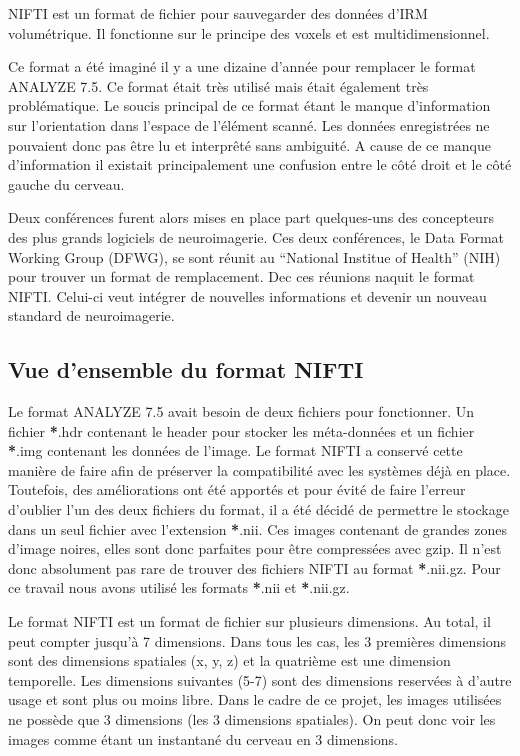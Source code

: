 \documentclass[a4paper,10pt,openany,oneside]{sphinxmanual}
\begin{document}
NIFTI est un format de fichier pour sauvegarder des données d'IRM volumétrique. Il fonctionne
sur le principe des voxels et est multidimensionnel.

Ce format a été imaginé il y a une dizaine d'année pour remplacer le format ANALYZE 7.5.
Ce format était très utilisé mais était également très problématique. Le soucis principal de
ce format étant le manque d'information sur l'orientation dans l'espace de l'élément scanné.
Les données enregistrées ne pouvaient donc pas être lu et interprêté sans ambiguité. A cause
de ce manque d'information il existait principalement une confusion entre le côté droit et le
côté gauche du cerveau.

Deux conférences furent alors mises en place part quelques-uns des concepteurs des plus grands
logiciels de neuroimagerie. Ces deux conférences, le Data Format Working Group (DFWG), se sont
réunit au ``National Institue of Health'' (NIH) pour trouver un format de remplacement. Dec ces
réunions naquit le format NIFTI. Celui-ci veut intégrer de nouvelles informations et devenir
un nouveau standard de neuroimagerie.


\subsection{Vue d'ensemble du format NIFTI}
\label{index:vue-d-ensemble-du-format-nifti}
Le format ANALYZE 7.5 avait besoin de deux fichiers pour fonctionner. Un fichier {\color{red}\bfseries{}*}.hdr contenant
le header pour stocker les méta-données et un fichier {\color{red}\bfseries{}*}.img contenant les données de l'image.
Le format NIFTI a conservé cette manière de faire afin de préserver la compatibilité avec les
systèmes déjà en place. Toutefois, des améliorations ont été apportés et pour évité de faire
l'erreur d'oublier l'un des deux fichiers du format, il a été décidé de permettre le stockage
dans un seul fichier avec l'extension {\color{red}\bfseries{}*}.nii. Ces images contenant de grandes zones d'image
noires, elles sont donc parfaites pour être compressées avec gzip. Il n'est donc absolument
pas rare de trouver des fichiers NIFTI au format {\color{red}\bfseries{}*}.nii.gz. Pour ce travail nous avons utilisé
les formats {\color{red}\bfseries{}*}.nii et {\color{red}\bfseries{}*}.nii.gz.

Le format NIFTI est un format de fichier sur plusieurs dimensions. Au total, il peut compter
jusqu'à 7 dimensions. Dans tous les cas, les 3 premières dimensions sont des dimensions spatiales
(x, y, z) et la quatrième est une dimension temporelle. Les dimensions suivantes (5-7) sont des
dimensions reservées à d'autre usage et sont plus ou moins libre. Dans le cadre de ce projet,
les images utilisées ne possède que 3 dimensions (les 3 dimensions spatiales). On peut donc voir
les images comme étant un instantané du cerveau en 3 dimensions.
\end{document}
